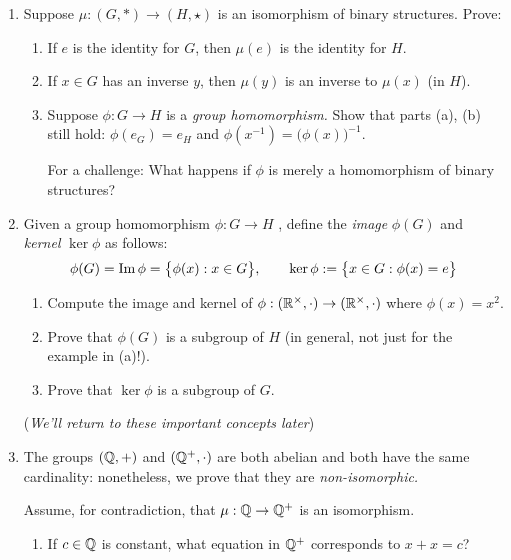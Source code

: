 \begin{exercises}{}
\begin{enumerate}
		
		\goodbreak
	  
	  
	  \item\label{exs:structural1} Suppose $\mu:(G,*)\to (H,\star)$ is an isomorphism of binary structures. Prove:
	  \begin{enumerate}
	    \item\label{exs:structidentity} If $e$ is the identity for $G$, then $\mu(e)$ is the identity for $H$.
	    
	    \item If $x\in G$ has an inverse $y$, then $\mu(y)$ is an inverse to $\mu(x)$ (in $H$).
	    
	    \item\label{exs:structural2} Suppose $\phi:G\to H$ is a \emph{group homomorphism.} Show that parts (a), (b) still hold: $\phi(e_G)=e_H$ and $\phi(x^{-1})=\bigl(\phi(x)\bigr)^{-1}$.\par
	    For a challenge: What happens if $\phi$ is merely a homomorphism of binary structures?
	  \end{enumerate}
	
		
	  \item\label{exs:kernelintro} Given a group homomorphism $\phi:G\to H$ , define the \emph{image} $\phi(G)$ and \emph{kernel} $\ker\phi$ as follows:
	  \[
	  	\phi(G)=\operatorname{Im} \phi=\bigl\{\phi(x):x\in G\bigr\},\qquad
	  	\ker\phi:=\bigl\{x\in G:\phi(x)=e\bigr\}
	  \]
	  \begin{enumerate}
	    \item Compute the image and kernel of $\phi:(\mathbb{R}^\times,\cdot)\to(\mathbb{R}^\times,\cdot)$ where $\phi(x)=x^2$.
	    \item Prove that $\phi(G)$ is a subgroup of $H$ (in general, not just for the example in (a)!).
	    \item Prove that $\ker\phi$ is a subgroup of $G$.
	  \end{enumerate}
	  (\emph{We'll return to these important concepts later})
			
		

		
		\item\label{exs:qnoniso} The groups $(\mathbb{Q},+)$ and $(\mathbb{Q}^+,\cdot)$ are both abelian and both have the same cardinality: nonetheless, we prove that they are \emph{non-isomorphic.}\par
		Assume, for contradiction, that $\mu:\mathbb{Q}\to\mathbb{Q}^+$ is an isomorphism.
		\begin{enumerate}
		  \item If $c\in\mathbb{Q}$ is constant, what equation in $\mathbb{Q}^+$ corresponds to $x+x=c$?
		  

\end{enumerate}
\end{enumerate}
\end{exercises}
